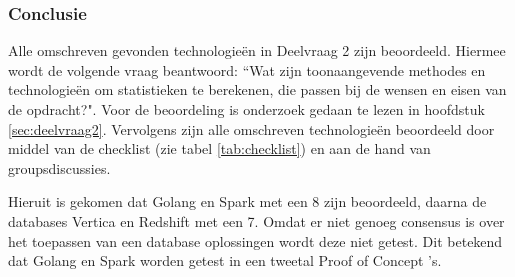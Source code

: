 \subsubsection{\textbf{Conclusie}}

Alle omschreven gevonden technologieën in Deelvraag 2 zijn beoordeeld. Hiermee wordt de volgende vraag beantwoord: ``Wat zijn toonaangevende methodes en technologieën om statistieken te berekenen, die passen bij de wensen en eisen van de opdracht?". Voor de beoordeling is onderzoek gedaan te lezen in hoofdstuk \ref{sec:deelvraag2}. Vervolgens zijn alle omschreven technologieën beoordeeld door middel van de checklist (zie tabel \ref{tab:checklist}) en aan de hand van groupsdiscussies.

Hieruit is gekomen dat Golang en Spark met een 8 zijn beoordeeld, daarna de databases Vertica en Redshift met een 7. Omdat er niet genoeg consensus is over het toepassen van een database oplossingen wordt deze niet getest. Dit betekend dat Golang en Spark worden getest in een tweetal Proof of Concept 's.